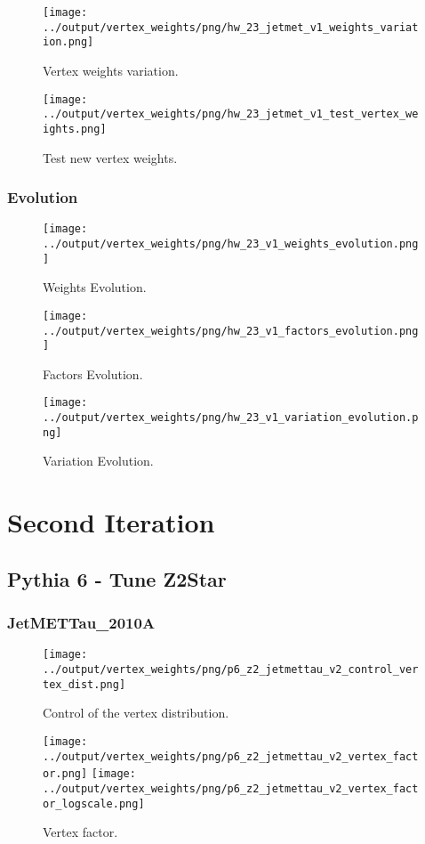 \documentclass[11pt]{book}
\begin{document}
\begin{figure}[ht]
\centering
\texttt{[image: ../output/vertex\_weights/png/hw\_23\_jetmet\_v1\_weights\_variation.png]}
\caption{Vertex weights variation.}
\end{figure}

\begin{figure}[ht]
\centering
\texttt{[image: ../output/vertex\_weights/png/hw\_23\_jetmet\_v1\_test\_vertex\_weights.png]}
\caption{Test new vertex weights.}
\end{figure}
\clearpage

\subsection{Evolution}
\begin{figure}[ht]
\centering
\texttt{[image: ../output/vertex\_weights/png/hw\_23\_v1\_weights\_evolution.png]}
\caption{Weights Evolution.}
\end{figure}


\begin{figure}[ht]
\centering
\texttt{[image: ../output/vertex\_weights/png/hw\_23\_v1\_factors\_evolution.png]}
\caption{Factors Evolution.}
\end{figure}

\begin{figure}[ht]
\centering
\texttt{[image: ../output/vertex\_weights/png/hw\_23\_v1\_variation\_evolution.png]}
\caption{Variation Evolution.}
\end{figure}
\clearpage

\chapter{Second Iteration}
\section{Pythia 6 - Tune Z2Star}
\subsection{JetMETTau\_2010A}
\begin{figure}[ht]
\centering
\texttt{[image: ../output/vertex\_weights/png/p6\_z2\_jetmettau\_v2\_control\_vertex\_dist.png]}
\caption{Control of the vertex distribution.}
\end{figure}

\begin{figure}[ht]
\centering
\texttt{[image: ../output/vertex\_weights/png/p6\_z2\_jetmettau\_v2\_vertex\_factor.png]}
\texttt{[image: ../output/vertex\_weights/png/p6\_z2\_jetmettau\_v2\_vertex\_factor\_logscale.png]}
\caption{Vertex factor.}
\end{figure}
\end{document}
